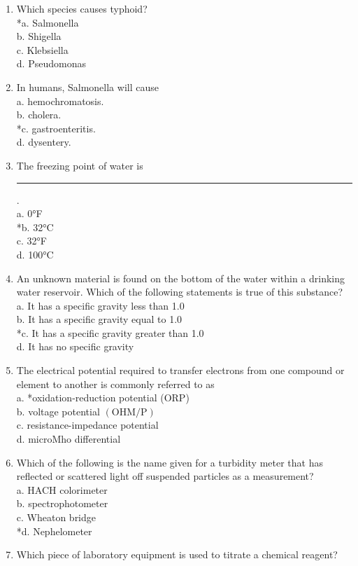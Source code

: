 \begin{enumerate}[1.]
\item Which species causes typhoid?\\
*a. Salmonella\\
b. Shigella\\
c. Klebsiella\\
d. Pseudomonas\\
\item In humans, Salmonella will cause\\
a. hemochromatosis.\\
b. cholera.\\
*c. gastroenteritis.\\
d. dysentery.\\
\item The freezing point of water is \rule{1.5cm}{0.5pt}.\\
a.	0°F\\
*b.	32°C\\
c.	32°F\\
d.	100°C\\
\item An unknown material is found on the bottom of the water within a drinking water reservoir. Which of the following statements is true of this substance?\\
a.	It has a specific gravity less than 1.0\\
b.	It has a specific gravity equal to 1.0\\
*c.	It has a specific gravity greater than 1.0\\
d.	It has no specific gravity\\
\item The electrical potential required to transfer electrons from one compound or element to another is commonly referred to as\\
a. *oxidation-reduction potential (ORP)\\
b. voltage potential $(\mathrm{OHM} / \mathrm{P})$\\
c. resistance-impedance potential\\
d. microMho differential
\item Which of the following is the name given for a turbidity meter that has reflected or scattered light off suspended particles as a measurement?\\
a. HACH colorimeter\\
b. spectrophotometer\\
c. Wheaton bridge\\
*d. Nephelometer\\
\item Which piece of laboratory equipment is used to titrate a chemical reagent?\\

\end{enumerate}
